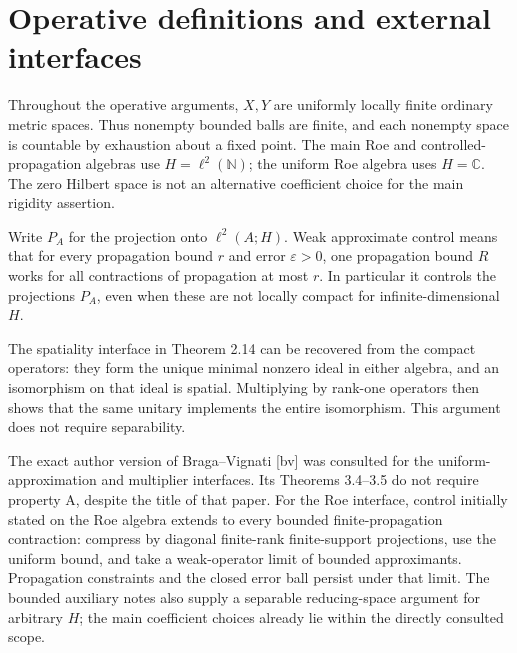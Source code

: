 \documentclass[10pt]{article}
\begin{document}
\section*{Operative definitions and external interfaces}
Throughout the operative arguments, \(X,Y\) are uniformly locally finite ordinary metric spaces. Thus nonempty bounded balls are finite, and each nonempty space is countable by exhaustion about a fixed point. The main Roe and controlled-propagation algebras use \(H=\ell^2(\mathbb N)\); the uniform Roe algebra uses \(H=\mathbb C\). The zero Hilbert space is not an alternative coefficient choice for the main rigidity assertion.\par
Write \(P_A\) for the projection onto \(\ell^2(A;H)\). Weak approximate control means that for every propagation bound \(r\) and error \(\varepsilon>0\), one propagation bound \(R\) works for all contractions of propagation at most \(r\). In particular it controls the projections \(P_A\), even when these are not locally compact for infinite-dimensional \(H\).\par
The spatiality interface in Theorem 2.14 can be recovered from the compact operators: they form the unique minimal nonzero ideal in either algebra, and an isomorphism on that ideal is spatial. Multiplying by rank-one operators then shows that the same unitary implements the entire isomorphism. This argument does not require separability.\par
The exact author version of Braga–Vignati [bv] was consulted for the uniform-approximation and multiplier interfaces. Its Theorems 3.4–3.5 do not require property A, despite the title of that paper. For the Roe interface, control initially stated on the Roe algebra extends to every bounded finite-propagation contraction: compress by diagonal finite-rank finite-support projections, use the uniform bound, and take a weak-operator limit of bounded approximants. Propagation constraints and the closed error ball persist under that limit. The bounded auxiliary notes also supply a separable reducing-space argument for arbitrary \(H\); the main coefficient choices already lie within the directly consulted scope.\par
\end{document}

